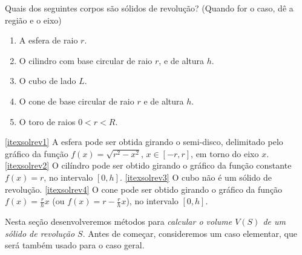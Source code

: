 \begin{exo}
Quais dos seguintes 
corpos são sólidos de revolução? (Quando for o caso, dê a região e
o eixo)
\begin{enumerate}
\item\label{itexsolrev1} A esfera de raio $r$.
\item\label{itexsolrev2} O cilindro com base circular de raio $r$, e de altura $h$.
\item\label{itexsolrev3} O cubo de lado $L$.
\item\label{itexsolrev4} O cone de base circular de raio $r$ e de altura $h$.
\item\label{itexsolrev5} O toro de raios $0<r<R$.
\end{enumerate}
\begin{sol}
\eqref{itexsolrev1} A esfera pode ser obtida girando o semi-disco,
delimitado pelo gráfico da função
$f(x)=\sqrt{r^2-x^2}$, $x\in [-r,r]$, em torno do eixo $x$.
\eqref{itexsolrev2} O cilíndro pode ser obtido girando o gráfico da função
constante $f(x)=r$, no intervalo $[0,h]$.
\eqref{itexsolrev3} O cubo não é um sólido de revolução.
\eqref{itexsolrev4} O cone pode ser obtido girando o gráfico da função
$f(x)=\frac{r}{h}x$ (ou $f(x)=r-\frac{r}{h}x$), no intervalo $[0,h]$. 
\end{sol}
\end{exo}


Nesta seção desenvolveremos 
métodos para \emph{calcular o volume $V(S)$ de um sólido de
revolução $S$}. Antes de começar, consideremos um caso elementar, que será também usado para o caso geral.

